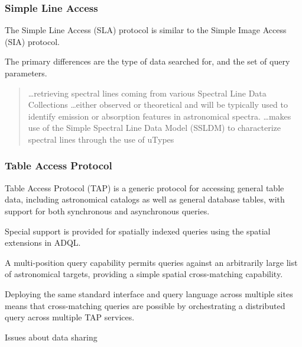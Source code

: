 \documentclass{article}
\begin{document}
{\subsubsection{Simple Line Access}

The Simple Line Access (SLA) protocol is similar to the Simple Image Access
(SIA) protocol.

The primary differences are the type of data searched for, and the set of query
parameters.

\begin{quote}
\ldots retrieving spectral lines coming from various Spectral Line Data
Collections
\ldots either observed or theoretical and will be typically used to identify
emission or absorption features in astronomical spectra.
\ldots makes use of the Simple Spectral Line Data Model
(SSLDM)  to characterize spectral
lines through the use of uTypes
\end{quote}
  
\subsubsection{Table Access Protocol}

Table Access Protocol (TAP) is a generic protocol for accessing general table
data, including astronomical catalogs as well as general database tables, with
support for both synchronous and asynchronous queries.

Special support is provided for spatially indexed queries using the spatial
extensions in ADQL.

A multi-position query capability permits queries against an arbitrarily large
list of astronomical targets, providing a simple spatial cross-matching
capability.

Deploying the same standard interface and query language across multiple sites
means that cross-matching queries are possible by orchestrating a distributed
query across multiple TAP services.

 









Issues about data sharing










}
\end{document}
